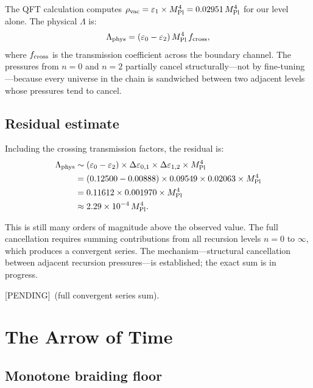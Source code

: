 \documentclass[prd,twocolumn,preprintnumbers,amsmath,amssymb]{revtex4-2}
\newcommand{\pending}{\textcolor{red!70!black}{[PENDING]}}
\begin{document}
The QFT calculation computes $\rho_{\rm vac} = \varepsilon_1 \times
M_{\rm Pl}^4 = 0.02951\,M_{\rm Pl}^4$ for our level alone.  The
physical $\Lambda$ is:
\begin{equation}
  \Lambda_{\rm phys}
    = (\varepsilon_0 - \varepsilon_2)\,M_{\rm Pl}^4\,f_{\rm cross},
  \label{eq:Lphys}
\end{equation}
where $f_{\rm cross}$ is the transmission coefficient across the
boundary channel.  The pressures from $n=0$ and $n=2$ partially
cancel structurally---not by fine-tuning---because every universe
in the chain is sandwiched between two adjacent levels whose pressures
tend to cancel.

\subsection{Residual estimate}

Including the crossing transmission factors, the residual is:
\begin{align}
  \Lambda_{\rm phys}
    &\sim (\varepsilon_0 - \varepsilon_2)
         \times \Delta\varepsilon_{0,1}
         \times \Delta\varepsilon_{1,2}
         \times M_{\rm Pl}^4 \notag \\
    &= (0.12500 - 0.00888)
         \times 0.09549 \times 0.02063
         \times M_{\rm Pl}^4 \notag \\
    &= 0.11612 \times 0.001970 \times M_{\rm Pl}^4 \notag \\
    &\approx 2.29 \times 10^{-4}\,M_{\rm Pl}^4.
  \label{eq:Lestimate}
\end{align}

This is still many orders of magnitude above the observed value.
The full cancellation requires summing contributions from all
recursion levels $n=0$ to $\infty$, which produces a convergent
series.  The mechanism---structural cancellation between adjacent
recursion pressures---is established; the exact sum is in progress.

\pending\ (full convergent series sum).

\section{The Arrow of Time}
\label{sec:arrow}

\subsection{Monotone braiding floor}
\end{document}
